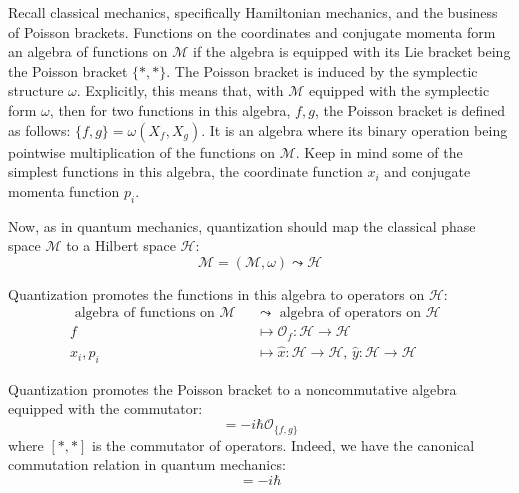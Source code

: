 \documentclass[a4paper,titlepage,twoside]{book}
\begin{document}
Recall classical mechanics, specifically Hamiltonian mechanics, and the business of Poisson brackets.  Functions on the coordinates and conjugate momenta form an algebra of functions on $\mathcal{M}$ if the algebra is equipped with its Lie bracket being the Poisson bracket $\lbrace *, *\rbrace$.  The Poisson bracket is induced by the symplectic structure $\omega$.  Explicitly, this means that, with $\mathcal{M}$ equipped with the symplectic form $\omega$, then for two functions in this algebra, $f,g$, the Poisson bracket is defined as follows: $\lbrace f, g\rbrace = \omega(X_f,X_g)$.  It is an algebra where its binary operation being pointwise multiplication of the functions on $\mathcal{M}$.  Keep in mind some of the simplest functions in this algebra, the coordinate function $x_i$ and conjugate momenta function $p_i$.  

Now, as in quantum mechanics, quantization should map the classical phase space $\mathcal{M}$ to a Hilbert space $\mathcal{H}$:
\begin{equation}
\mathcal{M} = (\mathcal{M}, \omega) \leadsto \mathcal{H}
\end{equation}


Quantization promotes the functions in this algebra to operators on $\mathcal{H}$:
\begin{equation}
  \begin{aligned}
    \text{ algebra of functions on $\mathcal{M}$ } & \leadsto \text{ algebra of operators on $\mathcal{H}$ } \\
    f  & \mapsto \mathcal{O}_f:\mathcal{H} \to \mathcal{H} \\
    x_i, p_i & \mapsto \widehat{x} : \mathcal{H} \to \mathcal{H}, \, \widehat{y} : \mathcal{H} \to \mathcal{H}
\end{aligned}
\end{equation}

Quantization promotes the Poisson bracket to a noncommutative algebra equipped with the commutator:
\begin{equation}
  [ \mathcal{O}_f, \mathcal{O}_g ] = -i \hbar \mathcal{O}_{ \lbrace f,  g \rbrace}
\end{equation}
where $[*, * ]$ is the commutator of operators.  Indeed, we have the canonical commutation relation in quantum mechanics:
\begin{equation}
  [ \widehat{p}, \widehat{x} ] = -i \hbar
\end{equation}
\end{document}
